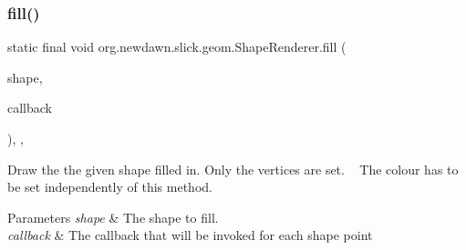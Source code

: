 \subsubsection{\texorpdfstring{fill()}{fill()}\hspace{0.1cm}{\footnotesize\ttfamily [2/3]}}
{\footnotesize\ttfamily static final void org.\+newdawn.\+slick.\+geom.\+Shape\+Renderer.\+fill (\begin{DoxyParamCaption}\item[{\mbox{\hyperlink{classorg_1_1newdawn_1_1slick_1_1geom_1_1_shape}{Shape}}}]{shape,  }\item[{\mbox{\hyperlink{interfaceorg_1_1newdawn_1_1slick_1_1geom_1_1_shape_renderer_1_1_point_callback}{Point\+Callback}}}]{callback }\end{DoxyParamCaption})\hspace{0.3cm}{\ttfamily [inline]}, {\ttfamily [static]}, {\ttfamily [private]}}

Draw the the given shape filled in. Only the vertices are set. ~\newline
The colour has to be set independently of this method.


\begin{DoxyParams}{Parameters}
{\em shape} & The shape to fill. \\
\hline
{\em callback} & The callback that will be invoked for each shape point \\
\hline
\end{DoxyParams}

